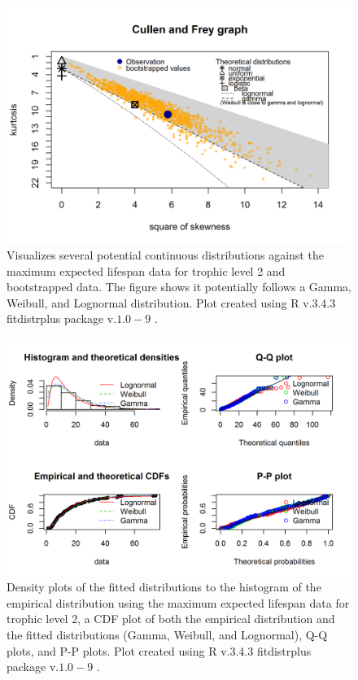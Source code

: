 \documentclass[oneside,12pt,final]{sty/ucthesis-CA2012}
\let\cite\citep                             %
\begin{document}
\begin{mainmatter}
\begin{figure}[H]
     \centering
       \includegraphics[width=.8\textwidth]{fig/cullen_frey_l2}
    \caption{Visualizes several potential continuous distributions against the maximum expected lifespan data for trophic level 2 and bootstrapped data. The figure shows it potentially follows a Gamma, Weibull, and Lognormal distribution. Plot created using R v.3.4.3 \cite{Rcite} fitdistrplus package v.$1.0-9$ \cite{fitdistrplus}. }
    \label{cf_l2}
\end{figure}

\begin{figure}[H]
     \centering
       \includegraphics[width=.8\textwidth]{fig/gof_l2}
    \caption{Density plots of the fitted distributions to the histogram of the empirical distribution using the maximum expected lifespan data for trophic level 2, a CDF plot of both the empirical distribution and the fitted distributions (Gamma, Weibull, and Lognormal), Q-Q plots, and P-P plots. Plot created using R v.3.4.3 \cite{Rcite} fitdistrplus package v.$1.0-9$ \cite{fitdistrplus}. }
    \label{gof_l2}
\end{figure}


\end{mainmatter}
\end{document}
